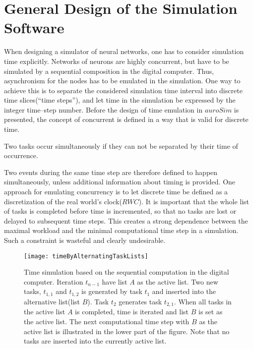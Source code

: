 



	\section{General Design of the Simulation Software}

		When designing a simulator of neural networks, one has to consider simulation time explicitly.
		Networks of neurons are highly concurrent, but have to be simulated by a sequential composition in the digital computer. 
		Thus, asynchronism for the nodes has to be emulated in the simulation.
		One way to achieve this is to separate the considered simulation time interval into discrete time slices(``time steps''), and let time in the simulation be expressed by the integer time--step number.
		Before the design of time emulation in $auroSim$ is presented, the concept of concurrent is defined in a way that is valid for discrete time.

		
		\begin{mydef}
			Two tasks occur simultaneously if they can not be separated by their time of occurrence. 
		\end{mydef}

		Two events during the same time step are therefore defined to happen simultaneously, unless additional information about timing is provided.		
		One approach for emulating concurrency is to let discrete time be defined as a discretization of the real world's clock($RWC$).
		It is important that the whole list of tasks is completed before time is incremented, so that no tasks are lost or delayed to subsequent time steps. %
		This creates a strong dependence between the maximal workload and the minimal computational time step in a simulation.
		Such a constraint is wasteful and clearly undesirable.

\begin{figure}[hbt!p]
	\centering
	\texttt{[image: timeByAlternatingTaskLists]}
	\caption[Time simulation by alternating task lists]{
			Time simulation based on the sequential computation in the digital computer.
			Iteration $t_{n-1}$ have list $A$ as the active list. Two new tasks, $t_{1,1}$ and $t_{1,2}$ is generated by task $t_1$ and inserted into the alternative list(list $B$). Task $t_2$ generates task $t_{2,1}$.
			When all tasks in the active list $A$ is completed, time is iterated and list $B$ is set as the active list. 
			The next computational time step with $B$ as the active list is illustrated in the lower part of the figure.
			Note that no tasks are inserted into the currently active list.
			}
	\label{figTimePropagationByAlternatingTaskLists}
\end{figure}

